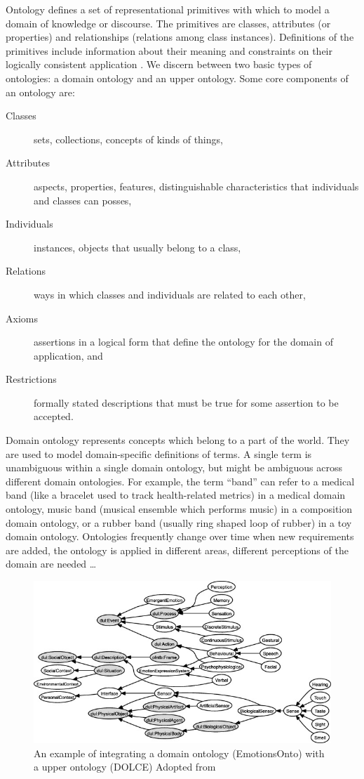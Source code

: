Ontology defines a set of representational primitives with which to model 
a domain of knowledge or discourse. The primitives are classes, attributes
(or properties) and relationships (relations among class instances). 
Definitions of the primitives include information about their
meaning and constraints on their logically consistent application
\citep{gruber2009ontology}.
We discern between two basic types of ontologies: a domain ontology and an
upper ontology. 
Some core components of an ontology are:
\begin{description}
\item[Classes] sets, collections, concepts of kinds of things,
\item[Attributes] aspects, properties, features, distinguishable characteristics that
	individuals and classes can posses,
\item[Individuals] instances, objects that usually belong to a class,
\item[Relations] ways in which classes and individuals are related to each other,
\item[Axioms] assertions in a logical form that define the ontology for the domain of application, and
\item[Restrictions] formally stated descriptions that must be true for some assertion to be accepted. 
\end{description}

Domain ontology represents concepts which belong to a part of the world. 
They are used to model domain-specific definitions of terms. A single term is
unambiguous within a single domain ontology, but might be ambiguous across
different domain ontologies. For example, the term ``band'' can refer to a
medical band (like a bracelet used to track health-related metrics) in a
medical domain ontology, music band (musical ensemble which performs music) in
a composition domain ontology, or a rubber band (usually ring shaped loop of
rubber) in a toy domain ontology. Ontologies frequently change over time
when new requirements are added, the ontology is applied in different areas, different 
perceptions of the domain are needed \dots

\begin{figure}
	\includegraphics{upper_domain_interaction.jpg}
	\caption{An example of integrating a domain ontology
	(EmotionsOnto) with a upper ontology (DOLCE)
	Adopted from \citep{gil2015emotions}
	}
	\label{fig:upper_domain_integration}
\end{figure}

